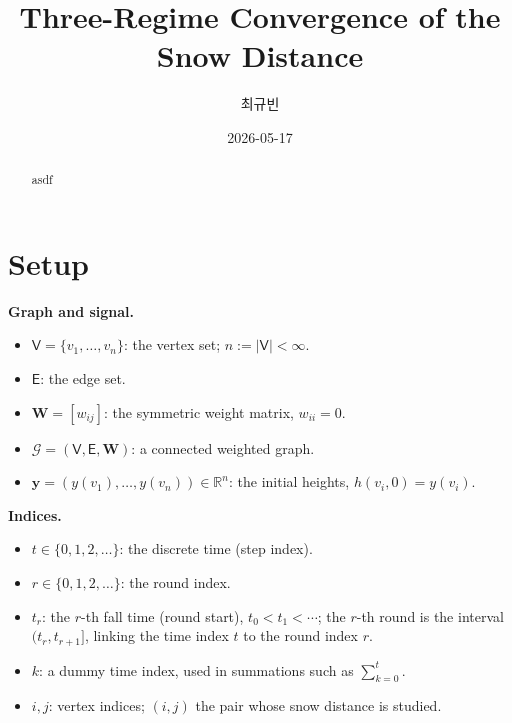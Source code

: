 \documentclass[11pt]{article}
\title{Three-Regime Convergence of the Snow Distance}
\author{최규빈}
\date{2026-05-17}
\theoremstyle{definition}
\begin{document}
\maketitle

\begin{abstract}
asdf
\end{abstract}

\tableofcontents
\bigskip

\section{Setup}
\label{sec:setup}


\noindent\textbf{Graph and signal.}
\begin{itemize}
  \item $\mathsf{V} = \{v_1, \ldots, v_n\}$: the vertex set; $n := |\mathsf{V}| < \infty$.
  \item $\mathsf{E}$: the edge set.
  \item $\mathbf{W} = [w_{ij}]$: the symmetric weight matrix, $w_{ii} = 0$.
  \item $\mathcal{G} = (\mathsf{V}, \mathsf{E}, \mathbf{W})$: a connected weighted graph.
  \item $\mathbf{y} = (y(v_1), \ldots, y(v_n)) \in \mathbb{R}^n$: the initial heights, $h(v_i, 0) = y(v_i)$.
\end{itemize}

\noindent\textbf{Indices.}
\begin{itemize}
  \item $t \in \{0, 1, 2, \ldots\}$: the discrete time (step index).
  \item $r \in \{0, 1, 2, \ldots\}$: the round index.
  \item $t_r$: the $r$-th fall time (round start), $t_0 < t_1 < \cdots$; the $r$-th round is the interval $(t_r, t_{r+1}]$, linking the time index $t$ to the round index $r$.
  \item $k$: a dummy time index, used in summations such as $\sum_{k=0}^{t}$.
  \item $i, j$: vertex indices; $(i,j)$ the pair whose snow distance is studied.
\end{itemize}
\end{document}
